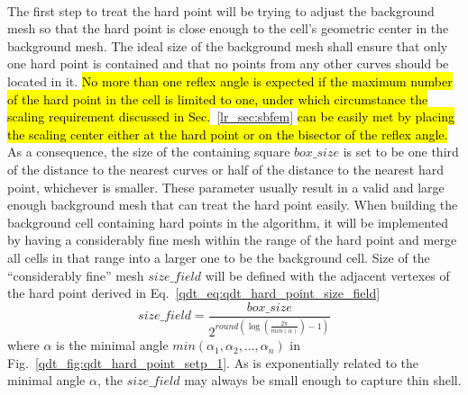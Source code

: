 \paragraph{}
The first step to treat the hard point will be trying to adjust the background mesh so that the hard point is close enough to the cell's geometric center in the background mesh.
The ideal size of the background mesh shall ensure that only one hard point is contained and that no points from any other curves should be located in it.
\hl{
    No more than one reflex angle is expected if the maximum number of the hard point in the cell is limited to one, under which circumstance the scaling requirement discussed in Sec.}~\ref{lr_sec:sbfem} \hl{can be easily met by placing the scaling center either at the hard point or on the bisector of the reflex angle.
}
As a consequence, the size of the containing square $box\_size$ is set to be one third of the distance to the nearest curves or half of the distance to the nearest hard point, whichever is smaller.
These parameter usually result in a valid and large enough background mesh that can treat the hard point easily. 
When building the background cell containing hard points in the algorithm, it will be implemented by having a considerably fine mesh within the range of the hard point and merge all cells in that range into a larger one to be the background cell.
Size of the ``considerably fine'' mesh $size\_field$ will be defined with the adjacent vertexes of the hard point derived in Eq.~\ref{qdt_eq:qdt_hard_point_size_field}
    \begin{equation}
        size\_field = \frac{box\_size}{
            2^{
                round(
                    \log(\frac{2 \pi}{ min(\alpha)})-1
                )
            }
        }
    \label{qdt_eq:qdt_hard_point_size_field}
    \end{equation}
where $\alpha$ is the minimal angle $min(\alpha_1, \alpha_2, \dots, \alpha_n)$ in Fig.~\ref{qdt_fig:qdt_hard_point_setp_1}.
As is exponentially related to the minimal angle $\alpha$, the $size\_field$ may always be small enough to capture thin shell.
